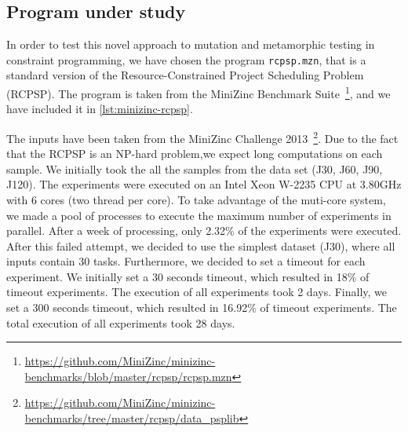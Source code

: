 \subsection{Program under study}
In order to test this novel approach to mutation and metamorphic
testing in constraint programming, we have chosen the program
\lstinline|rcpsp.mzn|, that is a standard version of
the Resource-Constrained Project Scheduling Problem (RCPSP). The
program is taken from the MiniZinc Benchmark
Suite~\footnote{\url{https://github.com/MiniZinc/minizinc-benchmarks/blob/master/rcpsp/rcpsp.mzn}},
and we have included it in \ref{lst:minizinc-rcpsp}.

The inputs have been taken from the MiniZinc Challenge
2013~\footnote{\url{https://github.com/MiniZinc/minizinc-benchmarks/tree/master/rcpsp/data_psplib}}. 
Due to the fact that the RCPSP is an NP-hard problem,we expect long computations on each sample. We initially took the all the samples from the
data set (J30, J60, J90, J120). 
The experiments were executed on an Intel Xeon W-2235 CPU at 3.80GHz with 6 cores (two thread per core). To take advantage of the muti-core system, we made a pool of processes to execute the maximum number of experiments in parallel. After a week of processing, only 2.32\% of the experiments were executed.
After this failed attempt, we decided to use the simplest
dataset (J30), where all inputs contain 30 tasks. Furthermore, we decided to set a timeout for each experiment. We initially set a 30 seconds timeout, which resulted in 18\% of timeout experiments. The execution of all experiments took 2 days. Finally, we set a 300 seconds timeout, which resulted in 16.92\% of timeout experiments. The total execution of all experiments took 28 days. 

